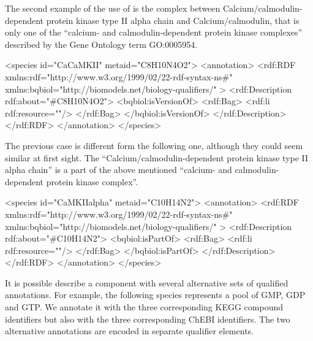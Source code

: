 The second example of the use of  is the
complex between Calcium/calmodulin-dependent protein kinase type
II alpha chain and Calcium/calmodulin, that is only one of the
``calcium- and calmodulin-dependent protein kinase complexes''
described by the Gene Ontology term GO:0005954.

\begin{example}
<species id="CaCaMKII" metaid="C8H10N4O2">
  <annotation>
    <rdf:RDF
      xmlns:rdf="http://www.w3.org/1999/02/22-rdf-syntax-ns\#"
      xmlns:bqbiol="http://biomodels.net/biology-qualifiers/"
    >
      <rdf:Description rdf:about="\#C8H10N4O2">
        <bqbiol:isVersionOf>
          <rdf:Bag>
            <rdf:li rdf:resource="\!"/>
          </rdf:Bag>
        </bqbiol:isVersionOf>
      </rdf:Description>
    </rdf:RDF>
  </annotation>
</species>
\end{example}

The previous case is different form the following one, although they
could seem similar at first sight. The
``Calcium/calmodulin-dependent protein kinase type II alpha
chain'' is a part of the above mentioned ``calcium- and
calmodulin-dependent protein kinase complex''.

\begin{example}
<species id="CaMKIIalpha" metaid="C10H14N2">
  <annotation>
    <rdf:RDF
      xmlns:rdf="http://www.w3.org/1999/02/22-rdf-syntax-ns\#"
      xmlns:bqbiol="http://biomodels.net/biology-qualifiers/"
    >
      <rdf:Description rdf:about="\#C10H14N2">
        <bqbiol:isPartOf>
          <rdf:Bag>
            <rdf:li rdf:resource="\!"/>
          </rdf:Bag>
        </bqbiol:isPartOf>
      </rdf:Description>
    </rdf:RDF>
  </annotation>
</species>
\end{example}

It is possible describe a component with several alternative sets
of qualified annotations. For example, the following species
represents a pool of  GMP, GDP and GTP. We annotate it with the
three corresponding KEGG compound identifiers but also with the
three corresponding ChEBI identifiers.  The two alternative
annotations are encoded in separate  qualifier
elements.

